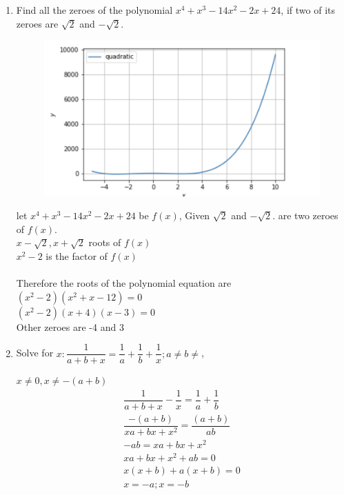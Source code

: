 \documentclass[journal,12pt,twocolumn]{IEEEtran}
\renewcommand\thesection{\arabic{section}}
\begin{document}
\begin{enumerate}[label=\thesection.\arabic*.,ref=\thesection.\theenumi]
\item  Find all the zeroes of the polynomial $x^4+x^3-14x^2-2x+24$, if two of its zeroes are $\sqrt{2}$ and $-\sqrt{2}$. \\
 \begin{figure}
	  \centering 
	  \includegraphics[width=\columnwidth]{5.4}
	  \caption{}
	  \label{fig:geometry-3.9.pdf}
 \end{figure}
\solution let $x^4+x^3-14x^2-2x+24$ be $f(x)$, Given $\sqrt{2}$ and $-\sqrt{2}$. are two zeroes of $f(x)$. \\

$x-\sqrt{2}, x+\sqrt{2}$ roots of $f(x)$ \\
$x^2-2$ is the factor of $f(x)$ \\

 \\
Therefore the roots of the polynomial equation are $(x^2-2)(x^2+x-12) = 0$ \\
$(x^2-2)(x+4)(x-3) = 0$ \\
Other zeroes are -4 and 3 \\

\item Solve for $x: \dfrac{1}{a+b+x} = \dfrac{1}{a} + \dfrac{1}{b} + \dfrac{1}{x}; a \neq b \neq $, 

$x \neq 0, x \neq -(a+b)$\\
\begin{align}
\dfrac{1}{a+b+x} - \dfrac{1}{x} = \dfrac{1}{a} + \dfrac{1}{b} \nonumber \\
\dfrac{-(a+b)}{xa+bx+x^2} = \dfrac{(a+b)}{ab} \nonumber \\
-ab = xa+bx+x^2 \nonumber \\
xa+bx+x^2+ab = 0 \nonumber \\
x(x+b)+a(x+b) = 0 \nonumber \\
x = -a ; x= -b \nonumber
\end{align}


\end{enumerate}
\end{document}
